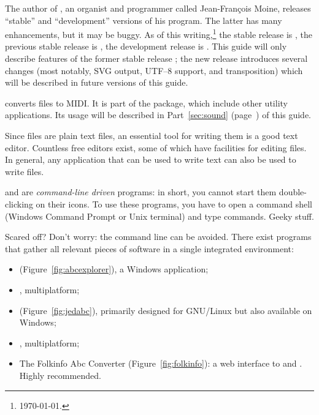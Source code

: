 \documentclass[a4paper,fullpage,12pt]{book}
\begin{document}

The author of \abcm, an organist and programmer called Jean-Fran\c
cois Moine, releases ``stable'' and ``development'' versions of his
program. The latter has many enhancements, but it may be buggy. As of
this writing,\footnote{\today.} the stable release is \abcmstable, the
previous stable release is \abcmoldstable, the development release is
\abcmdev. This guide will only describe features of the former stable
release \abcmoldstable; the new release introduces several changes
(most notably, SVG output, UTF--8 support, and transposition) which
will be described in future versions of this guide. 

\abcmid{} converts \ABC{} files to MIDI. It is part of the \abcMID{}
package, which include other utility applications. Its usage will be
described in Part~\ref{sec:sound} (page~\pageref{sec:sound}) of this
guide.

Since \ABC{} files are plain text files, an essential tool for writing
them is a good text editor. Countless free editors exist, some of
which have facilities for editing \ABC{} files. In general, any
application that can be used to write text can also be used to write
\ABC{} files.




\abcm{} and \abcmid{} are \emph{command-line driven} programs: in
short, you cannot start them double-clicking on their icons. To use
these programs, you have to open a command shell (Windows Command
Prompt or Unix terminal) and type commands. Geeky stuff.

Scared off? Don't worry: the command line can be avoided. There exist
programs that gather all relevant pieces of software in a single
integrated environment:

\begin{itemize}

  \item \abcexplorer{} (Figure~\ref{fig:abcexplorer}), a Windows
  application;
  
  \item \easyabc, multiplatform;
  
  \item \jedabc{} (Figure~\ref{fig:jedabc}), primarily designed for
  GNU/Linux but also available on Windows;
  
  \item \runabc, multiplatform;
  
  \item The Folkinfo Abc Converter (Figure~\ref{fig:folkinfo}): a web
  interface to \abcm{} and \abcMID. Highly recommended.
  
\end{itemize}
\end{document}
